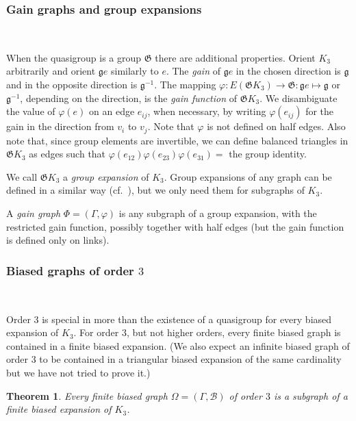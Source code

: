 \documentclass[reqno,12pt]{amsart}
\newtheorem{thm}{Theorem}[section]
\theoremstyle{remark}
\numberwithin{equation}{section}
\numberwithin{figure}{section}
\renewcommand \phi{\varphi}
\newcommand \inv{^{-1}}
\newcommand \cB{\mathcal{B}}
\newcommand\fg{\mathfrak g}
\newcommand \fG{\mathfrak G}
\begin{document}
\subsubsection{Gain graphs and group expansions}\label{gexp}\

When the quasigroup is a group $\fG$ there are additional properties.  Orient $K_3$ arbitrarily and orient $\fg e$ similarly to $e$.  The \emph{gain} of $\fg e$ in the chosen direction is $\fg$ and in the opposite direction is $\fg\inv$.  The mapping $\phi: E(\fG K_3) \to \fG: \fg e \mapsto \fg$ or $\fg\inv$, depending on the direction, is the \emph{gain function} of $\fG K_3$.  We disambiguate the value of $\phi(e)$ on an edge $e_{ij}$, when necessary, by writing $\phi(e_{ij})$ for the gain in the direction from $v_i$ to $v_j$.  Note that $\phi$ is not defined on half edges.  
Also note that, since group elements are invertible, we can define balanced triangles in $\fG K_3$ as edges such that $\phi(e_{12})\phi(e_{23})\phi(e_{31}) =$ the group identity.  

We call $\fG K_3$ a \emph{group expansion} of $K_3$.
Group expansions of any graph can be defined in a similar way (cf.\ \cite[Section I.5]{BG}), but we only need them for subgraphs of $K_3$.  

A \emph{gain graph} $\Phi = (\Gamma,\phi)$ is any subgraph of a group expansion, with the restricted gain function, possibly together with half edges (but the gain function is defined only on links).  

\subsubsection{Biased graphs of order $3$}\label{bg3}\

Order 3 is special in more than the existence of a quasigroup for every biased expansion of $K_3$.  For order 3, but not higher orders, every finite biased graph is contained in a finite biased expansion.  (We also expect an infinite biased graph of order 3 to be contained in a triangular biased expansion of the same cardinality but we have not tried to prove it.)  

\begin{thm}\label{T:qx}
Every finite biased graph $\Omega=(\Gamma,\cB)$ of order $3$ is a subgraph of a finite biased expansion of $K_3$.  
\end{thm}
\end{document}
